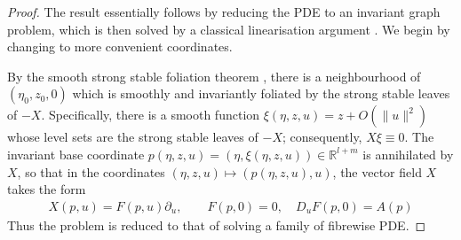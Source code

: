 \documentclass{article}
\newcommand{\RB}{\mathbb{R}}
\theoremstyle{plain}
\theoremstyle{definition}
\theoremstyle{remark}
\begin{document}
\begin{proof}
The result essentially follows by reducing the PDE to an invariant graph problem, which is then solved by a classical linearisation argument \cite{belitskii1978}. We begin by changing to more convenient coordinates.

By the smooth strong stable foliation theorem \cite[Theorem 1.4]{dutilleul2018}, there is a neighbourhood of $(\eta_0,z_0,0)$ which is smoothly and invariantly foliated by the strong stable leaves of $-X$. Specifically, there is a smooth function $\xi(\eta,z,u) = z + O(\|u\|^2)$ whose level sets are the strong stable leaves of $-X$; consequently, $X\xi\equiv 0$. The invariant base coordinate $p(\eta,z,u) = (\eta,\xi(\eta,z,u))\in\RB^{l+m}$ is annihilated by $X$, so that in the coordinates $(\eta,z,u)\mapsto (p(\eta,z,u),u)$, the vector field $X$ takes the form
\begin{align}\label{eq:Xeqns}
X(p,u) = F(p,u)\partial_u,\qquad F(p,0) = 0,\quad D_uF(p,0) = A(p)
\end{align}
Thus the problem is reduced to that of solving a family of fibrewise PDE.


\end{proof}
\end{document}
